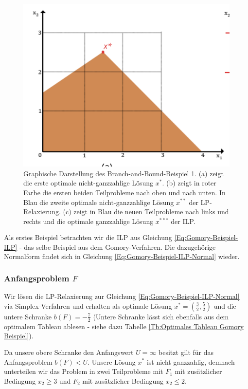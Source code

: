 \documentclass[tog]{acmsiggraph}
\begin{document}
\begin{figure}[t!]
  \centering
  \includegraphics[scale=0.40]{images/bab-example}
  \caption{Graphische Darstellung des Branch-and-Bound-Beispiel 1. (a) zeigt die erste optimale nicht-ganzzahlige Lösung $x^{*}$. (b) zeigt in roter Farbe die ersten beiden Teilprobleme nach oben und nach unten. In Blau die zweite optimale nicht-ganzzahlige Lösung $x^{**}$ der LP-Relaxierung. (c) zeigt in Blau die neuen Teilprobleme nach links und rechts und die optimale ganzzahlige Lösung $x^{***}$ der ILP. }
  \label{fig:bab-example1}
\end{figure}

Als erstes Beispiel betrachten wir die ILP aus Gleichung \ref{Eq:Gomory-Beispiel-ILP} - das selbe Beispiel aus dem Gomory-Verfahren. Die dazugehörige Normalform findet sich in Gleichung \ref{Eq:Gomory-Beispiel-ILP-Normal} wieder.

\subsubsection*{Anfangsproblem $F$}

Wir lösen die LP-Relaxierung zur Gleichung \ref{Eq:Gomory-Beispiel-ILP-Normal} via Simplex-Verfahren und erhalten als optimale Lösung $x^* = (\frac{3}{2}, \frac{5}{2})$ und die untere Schranke $b(F) = - \frac{7}{2}$ (Untere Schranke lässt sich ebenfalls aus dem optimalem Tableau ablesen - siehe dazu Tabelle \ref{Tb:Optimales Tableau Gomory Beispiel}).

Da unsere obere Schranke den Anfangswert $U = \infty$ besitzt gilt für das Anfangsproblem $b(F) < U$. Unsere Lösung $x^*$ ist nicht ganzzahlig, demnach unterteilen wir das Problem in zwei Teilprobleme mit $F_1$ mit zusätzlicher Bedingung $x_2 \geq 3$ und $F_2$ mit zusätzlicher Bedingung $x_2 \leq 2$.
\end{document}
